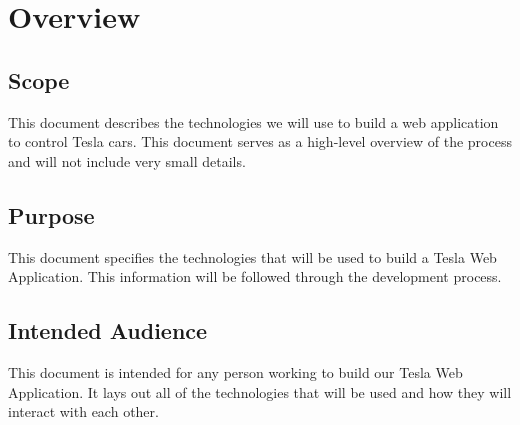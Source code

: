 \documentclass[onecolumn, draftclsnofoot,10pt, compsoc]{IEEEtran}
\begin{document}

\section{Overview}

    \subsection{Scope}
        This document describes the technologies we will use to build a web application to control Tesla cars. This document serves as a high-level overview of the process and will not include very small details.
    \subsection{Purpose}
        This document specifies the technologies that will be used to build a Tesla Web Application. This information will be followed through the development process.
        
    \subsection{Intended Audience}
        This document is intended for any person working to build our Tesla Web Application. It lays out all of the technologies that will be used and how they will interact with each other. 
\end{document}
